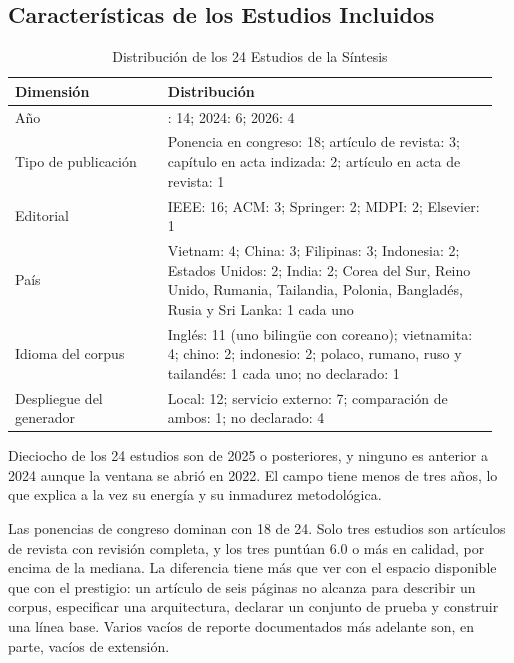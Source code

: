 \documentclass[man,12pt,floatsintext,donotrepeattitle]{apa7}
\begin{document}
\subsection{Características de los Estudios Incluidos}
\begin{table}[htbp]
\caption{Distribución de los 24 Estudios de la Síntesis}
\label{tab:2}
\small
\begin{tabular}{@{}>{\raggedright\arraybackslash}p{0.307\linewidth}>{\raggedright\arraybackslash}p{0.653\linewidth}@{}}
\toprule
Dimensión & Distribución \\ \midrule
Año & 2025: 14; 2024: 6; 2026: 4 \\
Tipo de publicación & Ponencia en congreso: 18; artículo de revista: 3; capítulo en acta indizada: 2; artículo en acta de revista: 1 \\
Editorial & IEEE: 16; ACM: 3; Springer: 2; MDPI: 2; Elsevier: 1 \\
País & Vietnam: 4; China: 3; Filipinas: 3; Indonesia: 2; Estados Unidos: 2; India: 2; Corea del Sur, Reino Unido, Rumania, Tailandia, Polonia, Bangladés, Rusia y Sri Lanka: 1 cada uno \\
Idioma del corpus & Inglés: 11 (uno bilingüe con coreano); vietnamita: 4; chino: 2; indonesio: 2; polaco, rumano, ruso y tailandés: 1 cada uno; no declarado: 1 \\
Despliegue del generador & Local: 12; servicio externo: 7; comparación de ambos: 1; no declarado: 4 \\
\bottomrule
\end{tabular}
\par{}
\end{table}

Dieciocho de los 24 estudios son de 2025 o posteriores, y ninguno es anterior a 2024 aunque la ventana se abrió en 2022. El campo tiene menos de tres años, lo que explica a la vez su energía y su inmadurez metodológica.

Las ponencias de congreso dominan con 18 de 24. Solo tres estudios son artículos de revista con revisión completa, y los tres puntúan 6.0 o más en calidad, por encima de la mediana. La diferencia tiene más que ver con el espacio disponible que con el prestigio: un artículo de seis páginas no alcanza para describir un corpus, especificar una arquitectura, declarar un conjunto de prueba y construir una línea base. Varios vacíos de reporte documentados más adelante son, en parte, vacíos de extensión.
\end{document}
